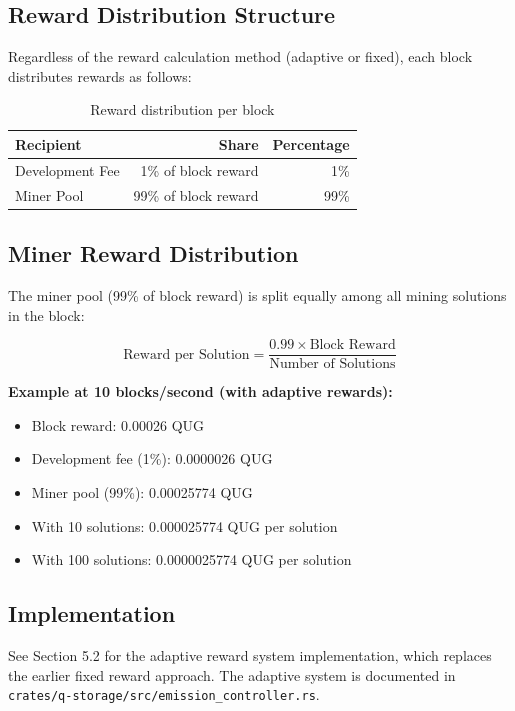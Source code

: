 \documentclass[11pt,a4paper]{article}
\begin{document}
\subsection{Reward Distribution Structure}

Regardless of the reward calculation method (adaptive or fixed), each block distributes rewards as follows:

\begin{table}[h]
\centering
\begin{tabular}{lrr}
\toprule
\textbf{Recipient} & \textbf{Share} & \textbf{Percentage} \\
\midrule
Development Fee & 1\% of block reward & 1\% \\
Miner Pool & 99\% of block reward & 99\% \\
\bottomrule
\end{tabular}
\caption{Reward distribution per block}
\end{table}

\subsection{Miner Reward Distribution}

The miner pool (99\% of block reward) is split equally among all mining solutions in the block:

\begin{equation}
\text{Reward per Solution} = \frac{0.99 \times \text{Block Reward}}{\text{Number of Solutions}}
\end{equation}

\textbf{Example at 10 blocks/second (with adaptive rewards):}
\begin{itemize}
    \item Block reward: 0.00026 QUG
    \item Development fee (1\%): 0.0000026 QUG
    \item Miner pool (99\%): 0.00025774 QUG
    \item With 10 solutions: 0.000025774 QUG per solution
    \item With 100 solutions: 0.0000025774 QUG per solution
\end{itemize}

\subsection{Implementation}

See Section 5.2 for the adaptive reward system implementation, which replaces the earlier fixed reward approach. The adaptive system is documented in \texttt{crates/q-storage/src/emission\_controller.rs}.
\end{document}
